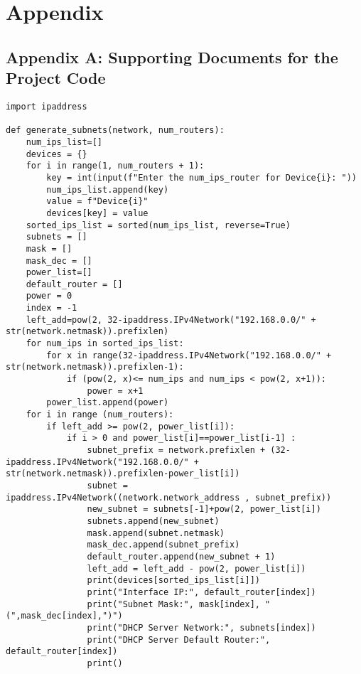 \chapter*{Appendix}

\section{Appendix A: Supporting Documents for the Project Code}


\begin{lstlisting}[style=pythonStyle, caption={Automated Subnet Allocation.}, backgroundcolor=\color{codebackground}]
import ipaddress

def generate_subnets(network, num_routers):
    num_ips_list=[]
    devices = {}
    for i in range(1, num_routers + 1):
        key = int(input(f"Enter the num_ips_router for Device{i}: "))
        num_ips_list.append(key)
        value = f"Device{i}"
        devices[key] = value
    sorted_ips_list = sorted(num_ips_list, reverse=True)
    subnets = []
    mask = []
    mask_dec = []
    power_list=[]
    default_router = []
    power = 0
    index = -1
    left_add=pow(2, 32-ipaddress.IPv4Network("192.168.0.0/" + str(network.netmask)).prefixlen)
    for num_ips in sorted_ips_list:
        for x in range(32-ipaddress.IPv4Network("192.168.0.0/" + str(network.netmask)).prefixlen-1):
            if (pow(2, x)<= num_ips and num_ips < pow(2, x+1)):
                power = x+1
        power_list.append(power)
    for i in range (num_routers):
        if left_add >= pow(2, power_list[i]):
            if i > 0 and power_list[i]==power_list[i-1] :
                subnet_prefix = network.prefixlen + (32-ipaddress.IPv4Network("192.168.0.0/" + str(network.netmask)).prefixlen-power_list[i])
                subnet = ipaddress.IPv4Network((network.network_address , subnet_prefix))
                new_subnet = subnets[-1]+pow(2, power_list[i]) 
                subnets.append(new_subnet)
                mask.append(subnet.netmask)
                mask_dec.append(subnet_prefix)
                default_router.append(new_subnet + 1)
                left_add = left_add - pow(2, power_list[i])
                print(devices[sorted_ips_list[i]])
                print("Interface IP:", default_router[index])
                print("Subnet Mask:", mask[index], "(",mask_dec[index],")")
                print("DHCP Server Network:", subnets[index])
                print("DHCP Server Default Router:", default_router[index])
                print()
            

\end{lstlisting}
